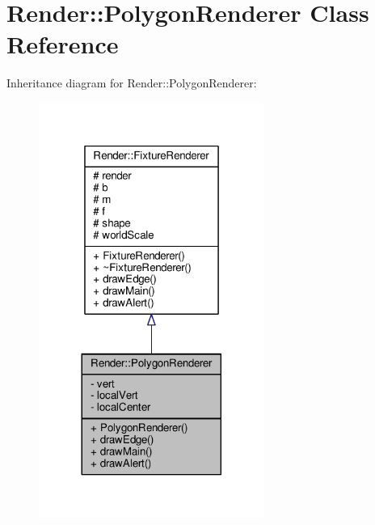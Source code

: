 \hypertarget{classRender_1_1PolygonRenderer}{}\section{Render\+:\+:Polygon\+Renderer Class Reference}
\label{classRender_1_1PolygonRenderer}


Inheritance diagram for Render\+:\+:Polygon\+Renderer\+:
\nopagebreak
\begin{figure}[H]
\begin{center}
\leavevmode
\includegraphics[width=209pt]{classRender_1_1PolygonRenderer__inherit__graph}
\end{center}
\end{figure}


